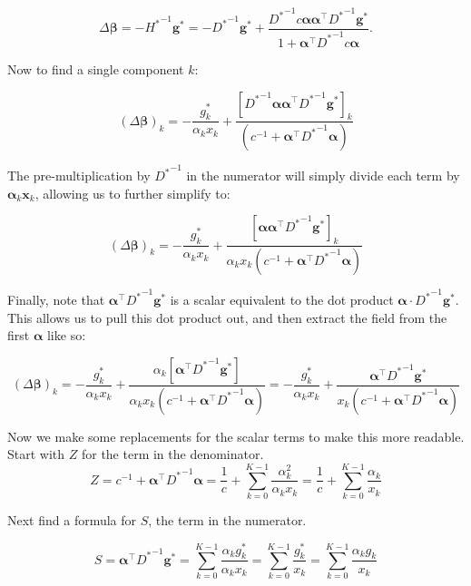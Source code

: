 \documentclass[twoside]{article}
\begin{document}
\[
\Delta \boldsymbol{\beta} = -{H^*}^{-1} \boldsymbol{g}^*= - {D^*}^{-1} \boldsymbol{g}^* + \frac{{D^*}^{-1}c \boldsymbol{\alpha} \boldsymbol{\alpha}^{\top}{D^*}^{-1}\boldsymbol{g}^*}{1 + \boldsymbol{\alpha}^{\top}{D^*}^{-1}c \boldsymbol{\alpha}}.
\]

Now to find a single component $k$:

\[
\left({\Delta \boldsymbol{\beta}}\right)_k = - \frac{{g}^*_k}{{\alpha}_k{x}_k} + \frac{\left[{D^*}^{-1}\boldsymbol{\alpha}\boldsymbol{\alpha}^\top{D^*}^{-1}\boldsymbol{g}^*\right]_k}{(c^{-1} + \boldsymbol{\alpha}^\top{D^*}^{-1}\boldsymbol{\alpha})}
\]

The pre-multiplication by ${D^*}^{-1}$ in the numerator will simply divide each term by $\boldsymbol{\alpha}_k\boldsymbol{x}_k$, allowing us to further simplify to:

\[
\left({\Delta \boldsymbol{\beta}}\right)_k = - \frac{{g}^*_k}{{\alpha}_k{x}_k} + \frac{\left[\boldsymbol{\alpha}\boldsymbol{\alpha}^\top{D^*}^{-1}\boldsymbol{g}^*\right]_k}{{\alpha}_k{x}_k(c^{-1} + \boldsymbol{\alpha}^\top{D^*}^{-1}\boldsymbol{\alpha})}
\]

Finally, note that $\boldsymbol{\alpha}^\top{D^*}^{-1}\boldsymbol{g}^*$ is a scalar equivalent to the dot product $\boldsymbol{\alpha} \cdot {D^*}^{-1}\boldsymbol{g}^*$. This allows us to pull this dot product out, and then extract the field from the first $\boldsymbol{\alpha}$ like so:

\[
\left({\Delta \boldsymbol{\beta}}\right)_k = - \frac{{g}^*_k}{{\alpha}_k{x}_k} + \frac{{\alpha}_k\left[\boldsymbol{\alpha}^\top{D^*}^{-1}\boldsymbol{g}^*\right]}{{\alpha}_k{x}_k(c^{-1} + \boldsymbol{\alpha}^\top{D^*}^{-1}\boldsymbol{\alpha})} = - \frac{{g}^*_k}{{\alpha}_k{x}_k} + \frac{\boldsymbol{\alpha}^\top{D^*}^{-1}\boldsymbol{g}^*}{{x}_k(c^{-1} + \boldsymbol{\alpha}^\top{D^*}^{-1}\boldsymbol{\alpha})}
\]

Now we make some replacements for the scalar terms to make this more readable. Start with $Z$ for the term in the denominator.
\[
Z = c^{-1} + \boldsymbol{\alpha}^\top{D^*}^{-1}\boldsymbol{\alpha} = \frac{1}{c} + \sum_{k=0}^{K-1}\frac{{\alpha}_k^2}{{\alpha}_k{x}_k} = \frac{1}{c} + \sum_{k=0}^{K-1}\frac{{\alpha}_k}{{x}_k}
\]

Next find a formula for $S$, the term in the numerator.

\[
S = \boldsymbol{\alpha}^\top{D^*}^{-1}\boldsymbol{g}^* = \sum_{k=0}^{K-1} \frac{{\alpha}_k{g}^*_k}{{\alpha}_k{x}_k} = \sum_{k=0}^{K-1} \frac{{g}^*_k}{{x}_k} = \sum_{k=0}^{K-1} \frac{{\alpha}_k {g}_k}{{x}_k}
\]
\end{document}
